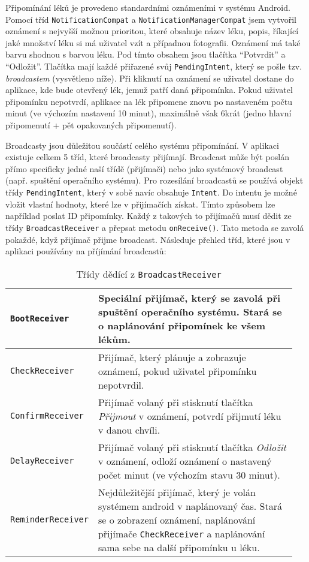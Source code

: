 \documentclass[../TakeYourPill.tex]{subfiles}
\begin{document}
Připomínání léků je provedeno standardními oznámeními v systému Android. Pomocí tříd \texttt{NotificationCompat} a \texttt{NotificationManagerCompat} jsem vytvořil oznámení s nejvyšší možnou prioritou, které obsahuje název léku, popis, říkající jaké množství léku si má uživatel vzít a případnou fotografii. Oznámení má také barvu shodnou s barvou léku. Pod tímto obsahem jsou tlačítka \enquote{Potvrdit} a \enquote{Odložit}. Tlačítka mají každé přiřazené svůj \texttt{PendingIntent}, který se pošle tzv. \textit{broadcastem} (vysvětleno níže). Při kliknutí na oznámení se uživatel dostane do aplikace, kde bude otevřený lék, jemuž patří daná připomínka. Pokud uživatel připomínku nepotvrdí, aplikace na lék připomene znovu po nastaveném počtu minut (ve výchozím nastavení 10 minut), maximálně však 6krát (jedno hlavní připomenutí + pět opakovaných připomenutí).


Broadcasty jsou důležitou součástí celého systému připomínání. V aplikaci existuje celkem 5 tříd, které broadcasty přijímají. Broadcast může být poslán přímo specificky jedné naší třídě (přijímači) nebo jako systémový broadcast (např. spuštění operačního systému). Pro rozesílání broadcastů se používá objekt třídy \texttt{PendingIntent}, který v sobě navíc obsahuje \texttt{Intent}. Do intentu je možné vložit vlastní hodnoty, které lze v přijímačích získat. Tímto způsobem lze například poslat ID připomínky. Každý z takových to přijímačů musí dědit ze třídy \texttt{BroadcastReceiver} a přepsat metodu \texttt{onReceive()}. Tato metoda se zavolá pokaždé, když přijímač přijme broadcast. Následuje přehled tříd, které jsou v aplikaci používány na příjímání broadcastů:


\begin{table}[h]
  \begin{tabular}{ |p{0.25\linewidth} | p{0.70\linewidth}| }
    \hline
    \texttt{BootReceiver} & Speciální přijímač, který se zavolá při spuštění operačního systému. Stará se o naplánování připomínek ke všem lékům.\\
    \hline
    \texttt{CheckReceiver} & Přijímač, který plánuje a zobrazuje oznámení, pokud uživatel připomínku nepotvrdil. \\
    \hline
    \texttt{ConfirmReceiver} & Přijímač volaný při stisknutí tlačítka \textit{Přijmout} v oznámení, potvrdí přijmutí léku v danou chvíli. \\
    \hline
    \texttt{DelayReceiver} & Přijímač volaný při stisknutí tlačítka \textit{Odložit} v oznámení, odloží oznámení o nastavený počet minut (ve výchozím stavu 30 minut). \\
    \hline
    \texttt{ReminderReceiver} & Nejdůležitější přijímač, který je volán systémem android v naplánovaný čas. Stará se o zobrazení oznámení, naplánování přijímače \texttt{CheckReceiver} a naplánování sama sebe na další připomínku u léku. \\
    \hline
  \end{tabular}
  \caption{Třídy dědící z \texttt{BroadcastReceiver}}
\end{table}
\end{document}
